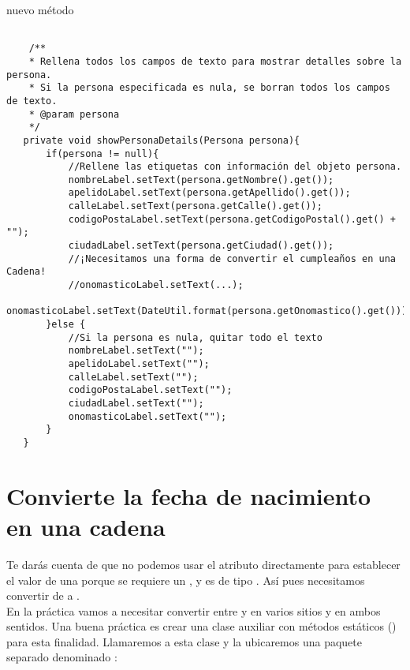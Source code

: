  nuevo método 
\begin{verbatim}

    /**
    * Rellena todos los campos de texto para mostrar detalles sobre la persona.
    * Si la persona especificada es nula, se borran todos los campos de texto.
    * @param persona
    */
   private void showPersonaDetails(Persona persona){
       if(persona != null){
           //Rellene las etiquetas con información del objeto persona.
           nombreLabel.setText(persona.getNombre().get());
           apelidoLabel.setText(persona.getApellido().get());
           calleLabel.setText(persona.getCalle().get());
           codigoPostaLabel.setText(persona.getCodigoPostal().get() + "");
           ciudadLabel.setText(persona.getCiudad().get());
           //¡Necesitamos una forma de convertir el cumpleaños en una Cadena!
           //onomasticoLabel.setText(...);
           onomasticoLabel.setText(DateUtil.format(persona.getOnomastico().get()));
       }else {
           //Si la persona es nula, quitar todo el texto
           nombreLabel.setText("");
           apelidoLabel.setText("");
           calleLabel.setText("");
           codigoPostaLabel.setText("");
           ciudadLabel.setText("");
           onomasticoLabel.setText("");
       }
   }
\end{verbatim}

\section{Convierte la fecha de nacimiento en una cadena}
Te darás cuenta de que no podemos usar el atributo  directamente 
para establecer el valor de una  porque se requiere un , y  es de 
tipo . Así pues necesitamos convertir  de  a .\\

En la práctica vamos a necesitar convertir entre  y  en varios sitios y en ambos 
sentidos. Una buena práctica es crear una clase auxiliar con métodos estáticos () para esta finalidad. 
Llamaremos a esta clase  y la ubicaremos una paquete separado denominado :\\

